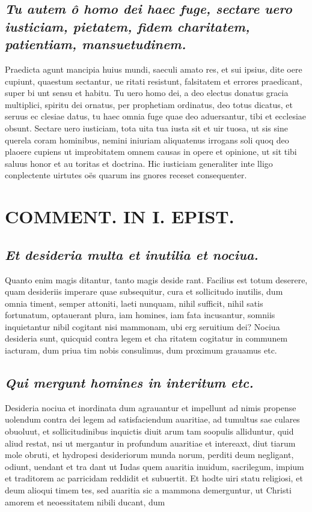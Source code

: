 \documentclass{article}
\begin{document}
\begin{pages}
\subsection*{\textit{Tu autem ô homo dei haec fuge, sectare uero iusticiam, pietatem, fidem charitatem, patientiam, mansuetudinem. }}\pstart Praedicta agunt mancipia huius mundi, saeculi amato res, et sui ipsius, dite oere cupiunt, quaestum sectantur, ue ritati resistunt, falsitatem et errores praedicant, super bi unt sensu et habitu. Tu uero homo dei, a deo electus donatus gracia multiplici, spiritu dei ornatus, per prophetiam ordinatus, deo totus dicatus, et seruus ec clesiae datus, tu haec omnia fuge quae deo aduersantur, tibi et ecclesiae obsunt. Sectare uero iusticiam, tota uita tua iusta sit et uir tuosa, ut sis sine querela coram hominibus, nemini iniuriam aliquatenus irrogans soli quoq deo plaoere cupiens ut improbitatem omnem causas in opere et opinione, ut sit tibi saluus honor et au toritas et doctrina. Hic iusticiam generaliter inte lligo conplectente uirtutes oës quarum ins gnores receset consequenter.  \pend
\section*{COMMENT. IN I. EPIST. }
\marginpar{[ p.168 ]}
{}
\subsection*{\textit{Et desideria multa et inutilia et nociua. }}\pstart Quanto enim magis ditantur, tanto magis deside rant. Facilius est totum deserere, quam desideriis imperare quae subsequitur, cura et sollicitudo inutilis, dum omnia timent, semper attoniti, laeti nunquam, nihil sufficit, nihil satis fortunatum, optauerant plura, iam homines, iam fata incusantur, somniis inquietantur nibil cogitant nisi mammonam, ubi erg seruitium dei? Nociua desideria sunt, quicquid contra legem et cha ritatem cogitatur in communem iacturam, dum priua tim nobis consulimus, dum proximum grauamus etc.  \pend
{}
{}
\subsection*{\textit{Qui mergunt homines in interitum etc. }}\pstart Desideria nociua et inordinata dum agrauantur et impellunt ad nimis propense uolendum contra dei legem ad satisfaciendum auaritiae, ad tumultus sae culares obuoluut, et sollicitudinibus inquictis diuit arum tam soopulis alliduntur, quid aliud restat, nsi ut mergantur in profundum auaritiae et intereaxt, diut tiarum mole obruti, et hydropesi desideriorum munda norum, perditi deum negligant, odiunt, uendant et tra dant ut Iudas quem auaritia inuidum, sacrilegum, impium et traditorem ac parricidam reddidit et subuertit. Et hodte uiri statu religiosi, et deum alioqui timem tes, sed auaritia sic a mammona demerguntur, ut Christi amorem et neoessitatem nibili ducant, dum  \pend

\end{pages}
\end{document}
